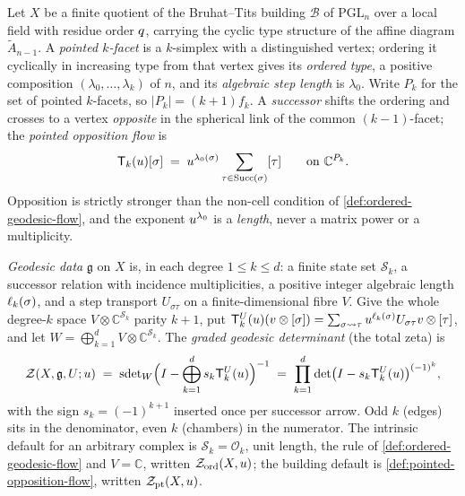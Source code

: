 \begin{definition}
\label{def:pointed-opposition-flow}
Let $X$ be a finite quotient of the Bruhat--Tits building $\mathcal B$ of
$\mathrm{PGL}_n$ over a local field with residue order $q$, carrying the
cyclic type structure of the affine diagram $\tilde A_{n-1}$. A \emph{pointed
$k$-facet} is a $k$-simplex with a distinguished vertex; ordering it cyclically
in increasing type from that vertex gives its \emph{ordered type}, a positive
composition $(\lambda_0,\dots,\lambda_k)$ of $n$, and its \emph{algebraic step
length} is $\lambda_0$. Write $P_k$ for the set of pointed $k$-facets, so
$|P_k| = (k+1)f_k$. A \emph{successor} shifts the ordering and crosses to a
vertex \emph{opposite} in the spherical link of the common $(k-1)$-facet; the
\emph{pointed opposition flow} is
\[
 \mathsf T_k(\uz)[\sigma] \;=\; \uz^{\lambda_0(\sigma)} %
 \sum_{\tau\in\operatorname{Succ}(\sigma)}[\tau] \qquad\text{on }\mathbb C^{P_k}. %
\]
Opposition is strictly stronger than the non-cell condition of
\cref{def:ordered-geodesic-flow}, and the exponent $u^{\lambda_0}$ is a
\emph{length}, never a matrix power or a multiplicity.
\end{definition}

\begin{definition}
\label{def:graded-geodesic-determinant}
\emph{Geodesic data} $\mathfrak g$ on $X$ is, in each degree $1\le k\le d$: a
finite state set $\mathcal S_k$, a successor relation with incidence
multiplicities, a positive integer algebraic length $\ell_k(\sigma)$, and a step %
transport $U_{\sigma\tau}$ on a finite-dimensional fibre $V$. Give the whole %
degree-$k$ space $V\otimes\mathbb C^{\mathcal S_k}$ parity $k+1$, put
$\mathsf T^U_k(\uz)(v\otimes[\sigma]) = \sum_{\sigma\rightsquigarrow\tau} %
\uz^{\wl_k(\sigma)}U_{\sigma\tau}v\otimes[\tau]$, and let %
$W = \bigoplus_{k=1}^d V\otimes\mathbb C^{\mathcal S_k}$. The \emph{graded
geodesic determinant} (the total zeta) is
\[
 \mathcal Z(X,\mathfrak g,U;u)
 \;=\; \operatorname{sdet}_W\Bigl(I - \bigoplus_{k=1}^d s_k\mathsf T^U_k(u)\Bigr)^{-1}
 \;=\; \prod_{k=1}^d\det\bigl(I - s_k\mathsf T^U_k(u)\bigr)^{(-1)^k},
\]
with the sign $s_k = (-1)^{k+1}$ inserted once per successor arrow. Odd $k$
(edges) sits in the denominator, even $k$ (chambers) in the numerator. The
intrinsic default for an arbitrary complex is $\mathcal S_k = \mathcal O_k$,
unit length, the rule of \cref{def:ordered-geodesic-flow} and $V=\mathbb C$,
written $\mathcal Z_{\mathrm{ord}}(X,u)$; the building default is
\cref{def:pointed-opposition-flow}, written $\mathcal Z_{\mathrm{pt}}(X,u)$.
\end{definition}

